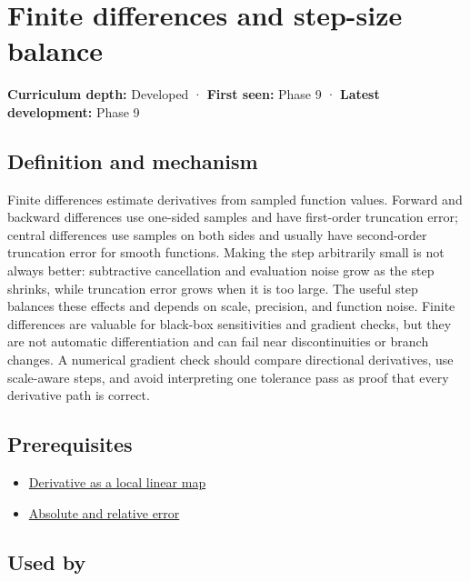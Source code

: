 \hypertarget{appendix-e2d7b4f2161d}{}\label{referencestart:appendix-e2d7b4f2161d}
\section{Finite differences and step-size balance}\label{appendix-e2d7b4f2161d-finite-differences-and-step-size-balance}

\textbf{Curriculum depth:} Developed · \textbf{First seen:} Phase 9 · \textbf{Latest development:} Phase 9

\subsection{Definition and mechanism}\label{appendix-e2d7b4f2161d-definition-and-mechanism}

Finite differences estimate derivatives from sampled function values. Forward and backward differences use one-sided samples and have first-order truncation error; central differences use samples on both sides and usually have second-order truncation error for smooth functions. Making the step arbitrarily small is not always better: subtractive cancellation and evaluation noise grow as the step shrinks, while truncation error grows when it is too large. The useful step balances these effects and depends on scale, precision, and function noise. Finite differences are valuable for black-box sensitivities and gradient checks, but they are not automatic differentiation and can fail near discontinuities or branch changes. A numerical gradient check should compare directional derivatives, use scale-aware steps, and avoid interpreting one tolerance pass as proof that every derivative path is correct.

\subsection{Prerequisites}\label{appendix-e2d7b4f2161d-prerequisites}

\begin{itemize}
\tightlist
\item
  \hyperref[appendix-7bc181935c42]{Derivative as a local linear map}
\item
  \hyperref[appendix-3ae74e89b4e6]{Absolute and relative error}
\end{itemize}

\subsection{Used by}\label{appendix-e2d7b4f2161d-used-by}

